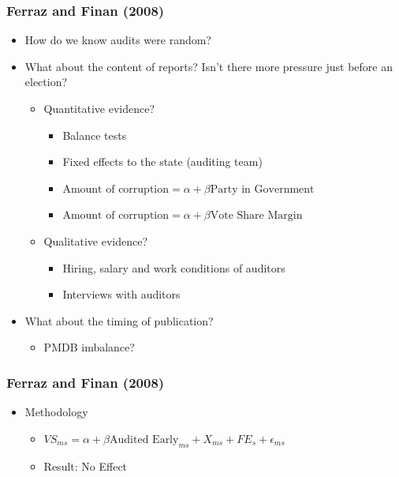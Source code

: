 \documentclass[xcolor=x11names,compress]{beamer}\usepackage[]{graphicx}\usepackage[]{color}
\renewcommand{\(}{\begin{columns}}
\renewcommand{\)}{\end{columns}}
\newcommand{\<}[1]{\begin{column}{#1}}
\renewcommand{\>}{\end{column}}
\begin{document}
\begin{frame}
\frametitle{Ferraz and Finan (2008)}
\begin{itemize}
\item How do we know audits were random?
\pause
\item What about the content of reports? Isn't there more pressure just before an election?
\pause
\begin{itemize}
\item Quantitative evidence?
\pause
\begin{itemize}
\item Balance tests
\pause
\item Fixed effects to the state (auditing team)
\pause
\item $\text{Amount of corruption} = \alpha + \beta \text{Party in Government}$
\pause
  \item $\text{Amount of corruption} = \alpha + \beta \text{Vote Share Margin}$
\end{itemize}
\pause
\item Qualitative evidence?
\pause
\begin{itemize}
\item Hiring, salary and work conditions of auditors
\pause
\item Interviews with auditors
\pause
\end{itemize}
\end{itemize}
\item What about the timing of publication?
\pause
\begin{itemize}
\item PMDB imbalance?
\end{itemize}
\end{itemize}
\end{frame}


\begin{frame}
\frametitle{Ferraz and Finan (2008)}
\begin{itemize}
\item Methodology
\begin{itemize}
\item $VS_{ms} = \alpha + \beta \text{Audited Early}_{ms} + X_{ms} + FE_{s} + \epsilon_{ms}$
\pause
\item Result: No Effect
\end{itemize}
\end{itemize}
\end{frame}
\end{document}
